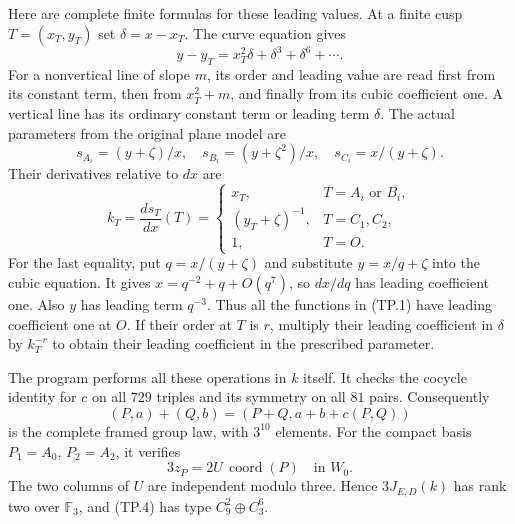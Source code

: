 Here are complete finite formulas for these leading
values.  At a finite cusp $T=(x_T,y_T)$ set
$\delta=x-x_T$.  The curve equation gives
\[
 y-y_T=x_T^2\delta+\delta^3+\delta^6+\cdots.
                                                               \tag{TP.2}
\]
For a nonvertical line of slope $m$, its order and
leading value are read first from its constant term,
then from $x_T^2+m$, and finally from its cubic
coefficient one.  A vertical line has its ordinary
constant term or leading term $\delta$.
The actual parameters from the original plane model
are
\[
 s_{A_i}=(y+\zeta)/x,\quad
 s_{B_i}=(y+\zeta^2)/x,\quad
 s_{C_i}=x/(y+\zeta).
\]
Their derivatives relative to $dx$ are
\[
 k_T=\frac{ds_T}{dx}(T)=
 \begin{cases}
 x_T,&T=A_i\text{ or }B_i,\\
 (y_T+\zeta)^{-1},&T=C_1,C_2,\\
 1,&T=O.
 \end{cases}                                                   \tag{TP.3}
\]
For the last equality, put $q=x/(y+\zeta)$ and
substitute $y=x/q+\zeta$ into the cubic equation.
It gives $x=q^{-2}+q+O(q^7)$, so $dx/dq$ has leading
coefficient one.  Also $y$ has leading term $q^{-3}$.
Thus all the functions in (TP.1) have leading coefficient
one at $O$.
If their order at $T$ is $r$, multiply their leading
coefficient in $\delta$ by $k_T^{-r}$ to obtain their
leading coefficient in the prescribed parameter.

The program  performs
all these operations in $k$ itself.
It checks the cocycle identity for $c$ on all $729$
triples and its symmetry on all $81$ pairs.
Consequently
\[
 (P,a)+(Q,b)=(P+Q,a+b+c(P,Q))                                \tag{TP.4}
\]
is the complete framed group law, with $3^{10}$ elements.
For the compact basis $P_1=A_0$, $P_2=A_2$, it verifies
\[
                    3z_P=2U\,\operatorname{coord}(P)
                         \quad\text{in }W_0.                \tag{TP.5}
\]
The two columns of $U$ are independent modulo three.
Hence $3J_{E,D}(k)$ has rank two over $\mathbb F_3$,
and (TP.4) has type $C_9^2\oplus C_3^6$.

